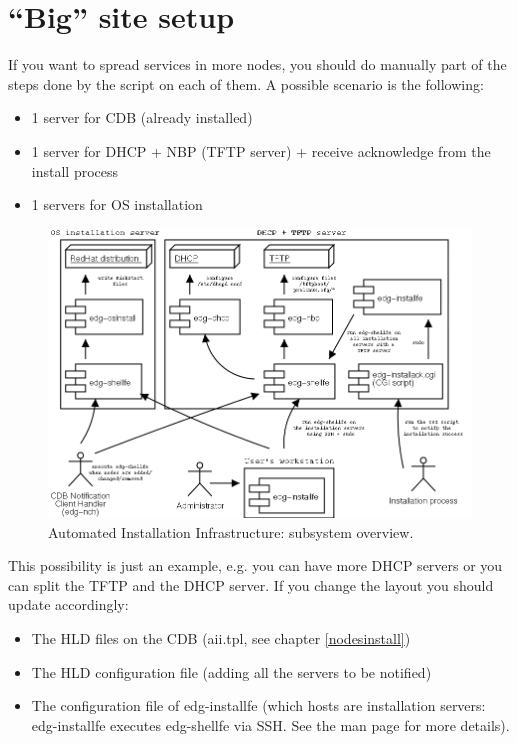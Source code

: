 \documentclass{datagridreport}
\begin{document}
\chapter{``Big'' site setup}
If you want to spread services in more nodes, you should do manually
part of the steps done by the script on each of them. A possible scenario is the following:
\begin{itemize}
\item 1 server for CDB (already installed)
\item 1 server for DHCP + NBP (TFTP server) + receive acknowledge from the install process
\item 1 servers for OS installation
\end{itemize}
\begin{figure}[htb]
  \begin{center}
    \includegraphics[width=155mm]{aii-multi.png}
  \end{center}
  \caption{Automated Installation Infrastructure: subsystem overview.}
  \label{fig:arch}
\end{figure}

This possibility is just an example, e.g. you can have more DHCP servers or
you can split the TFTP and the DHCP server. If you change the layout you should update
accordingly:
\begin{itemize}
\item The HLD files on the CDB (aii.tpl, see chapter \ref{nodesinstall})
\item The HLD configuration file (adding all the servers to be notified)
\item The configuration file of edg-installfe (which hosts are
      installation servers: edg-installfe executes edg-shellfe via
      SSH. See the man page for more details).
\end{itemize}
\end{document}

